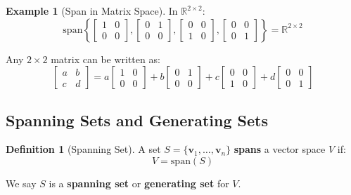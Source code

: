 \documentclass[12pt,a4paper]{article}
\theoremstyle{definition}
\newtheorem{definition}{Definition}[section]
\newtheorem{example}{Example}[section]
\begin{document}
\begin{example}[Span in Matrix Space]
In $\mathbb{R}^{2 \times 2}$:
\begin{equation}
\text{span}\left\{\begin{bmatrix} 1 & 0 \\ 0 & 0 \end{bmatrix}, \begin{bmatrix} 0 & 1 \\ 0 & 0 \end{bmatrix}, \begin{bmatrix} 0 & 0 \\ 1 & 0 \end{bmatrix}, \begin{bmatrix} 0 & 0 \\ 0 & 1 \end{bmatrix}\right\} = \mathbb{R}^{2 \times 2}
\end{equation}

Any $2 \times 2$ matrix can be written as:
\begin{equation}
\begin{bmatrix} a & b \\ c & d \end{bmatrix} = a\begin{bmatrix} 1 & 0 \\ 0 & 0 \end{bmatrix} + b\begin{bmatrix} 0 & 1 \\ 0 & 0 \end{bmatrix} + c\begin{bmatrix} 0 & 0 \\ 1 & 0 \end{bmatrix} + d\begin{bmatrix} 0 & 0 \\ 0 & 1 \end{bmatrix}
\end{equation}
\end{example}

\subsection{Spanning Sets and Generating Sets}

\begin{definition}[Spanning Set]
A set $S = \{\mathbf{v}_1, \ldots, \mathbf{v}_n\}$ \textbf{spans} a vector space $V$ if:
\begin{equation}
V = \text{span}(S)
\end{equation}

We say $S$ is a \textbf{spanning set} or \textbf{generating set} for $V$.
\end{definition}
\end{document}
